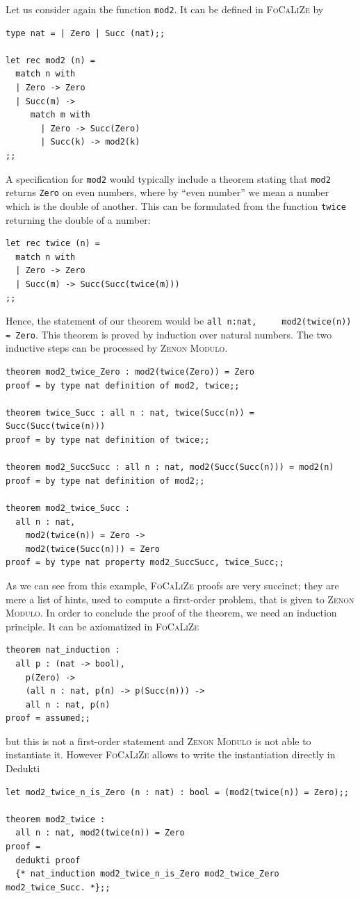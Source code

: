 \documentclass[english]{lipics}
\newcommand\lst[1]{{\rm \lstinline{#1}}}
\begin{document}
Let us consider again the function \texttt{mod2}. It can be defined in
  \textsc{FoCaLiZe} by
\begin{verbatim}
type nat = | Zero | Succ (nat);;

let rec mod2 (n) =
  match n with
  | Zero -> Zero
  | Succ(m) ->
     match m with
       | Zero -> Succ(Zero)
       | Succ(k) -> mod2(k)
;;
\end{verbatim}

  A specification for \texttt{mod2} would typically include a theorem
  stating that \texttt{mod2} returns \texttt{Zero} on even numbers,
  where by ``even number'' we mean a number which is the double of
  another.  This can be formulated from the function \texttt{twice}
  returning the double of a number:
\begin{verbatim}
let rec twice (n) =
  match n with
  | Zero -> Zero
  | Succ(m) -> Succ(Succ(twice(m)))
;;
\end{verbatim}

  Hence, the statement of our theorem would be \lst{all n:nat,
    mod2(twice(n)) = Zero}.  This theorem is proved by induction over
  natural numbers. The two inductive steps can be processed by
  \textsc{Zenon Modulo}.

\begin{verbatim}
theorem mod2_twice_Zero : mod2(twice(Zero)) = Zero
proof = by type nat definition of mod2, twice;;

theorem twice_Succ : all n : nat, twice(Succ(n)) = Succ(Succ(twice(n)))
proof = by type nat definition of twice;;

theorem mod2_SuccSucc : all n : nat, mod2(Succ(Succ(n))) = mod2(n)
proof = by type nat definition of mod2;;

theorem mod2_twice_Succ :
  all n : nat,
    mod2(twice(n)) = Zero ->
    mod2(twice(Succ(n))) = Zero
proof = by type nat property mod2_SuccSucc, twice_Succ;;
\end{verbatim}

As we can see from this example, \textsc{FoCaLiZe}
proofs are very succinct; they are mere a list of hints, used to
compute a  first-order problem, that is given to \textsc{Zenon
  Modulo}.  In order to conclude the proof of the theorem, we need
an induction principle. It can be  axiomatized in \textsc{FoCaLiZe}

\begin{verbatim}
theorem nat_induction :
  all p : (nat -> bool),
    p(Zero) ->
    (all n : nat, p(n) -> p(Succ(n))) ->
    all n : nat, p(n)
proof = assumed;;
\end{verbatim}
but this is not a first-order statement and \textsc{Zenon Modulo} is
not able to instantiate it. However \textsc{FoCaLiZe} allows to write
the instantiation directly in Dedukti
\begin{verbatim}
let mod2_twice_n_is_Zero (n : nat) : bool = (mod2(twice(n)) = Zero);;

theorem mod2_twice :
  all n : nat, mod2(twice(n)) = Zero
proof =
  dedukti proof
  {* nat_induction mod2_twice_n_is_Zero mod2_twice_Zero mod2_twice_Succ. *};;
\end{verbatim}
\end{document}
